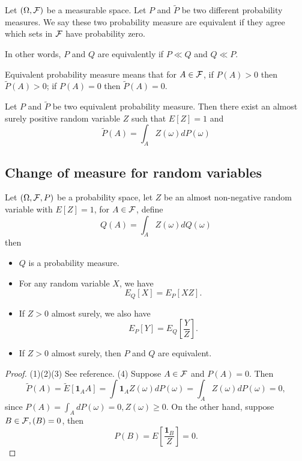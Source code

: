 \begin{refsection}
\begin{definition}
	\cite[35]{shreve2004stochastic2}Let $(\Omega,\mathcal{F})$ be a measurable space. Let $P$ and $\tilde{P}$ be two different probability measures. We say these two probability measure are equivalent if they agree which sets in $\mathcal{F}$ have probability zero.
	
	In other words, $P$ and $Q$ are equivalently if $P \ll Q$ and $Q \ll P$. 
\end{definition}

\begin{remark}
	Equivalent probability measure means that for $A\in \mathcal{F}$, if $P(A) > 0$ then $\tilde{P}(A) > 0$; if $P(A) = 0$ then $\tilde{P}(A) = 0$. 
\end{remark}

\begin{theorem}\cite[39]{shreve2004stochastic2}
	Let $P$ and $\tilde{P}$ be two equivalent probability measure. Then there exist an almost surely positive random variable $Z$ such that $E[Z]=1$ and 
	$$\tilde{P}(A)=\int_A Z(\omega)dP(\omega)$$
\end{theorem}




\subsection{Change of measure for random variables}
\begin{theorem}\label{ch:theory-of-stochastic-process:th:generateNewProbabilityMeasureAndEquivalence}
	\cite[33]{shreve2004stochastic2}Let $(\Omega,\mathcal{F},P)$ be a probability space, let $Z$ be an almost non-negative random variable with $E[Z]=1$, for $A\in \mathcal{F}$, define
	$$Q(A)=\int_A Z(\omega)dQ(\omega)$$
	then 
	\begin{itemize}
		\item $Q$ is a probability measure.
		\item For any random variable $X$, we have
		$$E_Q[X] = E_P[XZ].$$
		\item If $Z >0$ almost surely, we also have
		$$E_P[Y] = E_Q[\frac{Y}{Z}].$$
		
		\item If $Z > 0$ almost surely, then 
		$P$ and $Q$ are equivalent.
	\end{itemize}
	
	
\end{theorem}
\begin{proof}
	(1)(2)(3) See reference. (4) 
	Suppose $A\in \mathcal{F}$ and $P(A) = 0$. Then
	$$\tilde{P}(A) = \tilde{E}[\bm{1}_A A] =  \int \bm{1}_A Z(\omega) dP(\omega) = \int_A Z(\omega) dP(\omega) = 0,$$
	since $P(A) = \int_A dP(\omega) = 0, Z(\omega) \geq 0$.
	On the other hand, suppose $B\in \cF, \title{P}(B) = 0$, then
	$$P(B) = E[\frac{\bm{1}_B}{Z}] = 0.$$	
\end{proof}




\end{refsection}
